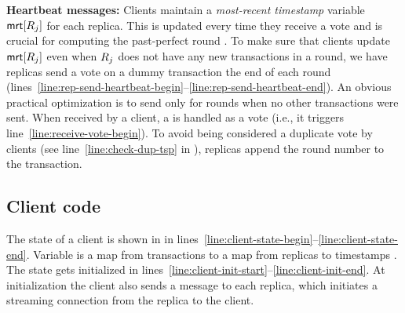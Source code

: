 \textbf{Heartbeat messages:}
Clients maintain a \emph{most-recent timestamp} variable $\textsf{mrt}[R_j]$ for each replica. This is updated every time they receive a vote and is crucial for computing the past-perfect round \rperf.
To make sure that clients update $\textsf{mrt}[R_j]$ even when $R_j$ does not have any new transactions in a round,
we have replicas send a vote on a dummy \heartBeat transaction the end of each round (lines~\ref{line:rep-send-heartbeat-begin}--\ref{line:rep-send-heartbeat-end}).
An obvious practical optimization is to send \heartBeat only for rounds when no other transactions were sent.
When received by a client, a \heartBeat is handled as a vote (i.e., it triggers line~\ref{line:receive-vote-begin}). To avoid being considered a duplicate vote by clients (see line~\ref{line:check-dup-tsp} in ), replicas append the round number to the \heartBeat transaction.


\subsection{Client code}




The state of a client is shown in  in lines~\ref{line:client-state-begin}--\ref{line:client-state-end}.
Variable \tsps is a map from transactions \tx to a map from replicas \rep to timestamps \tsp.
The state gets initialized in lines~\ref{line:client-init-start}--\ref{line:client-init-end}.
At initialization the client also sends a \msgconnect{} message to each replica, which initiates a streaming connection from the replica to the client.

